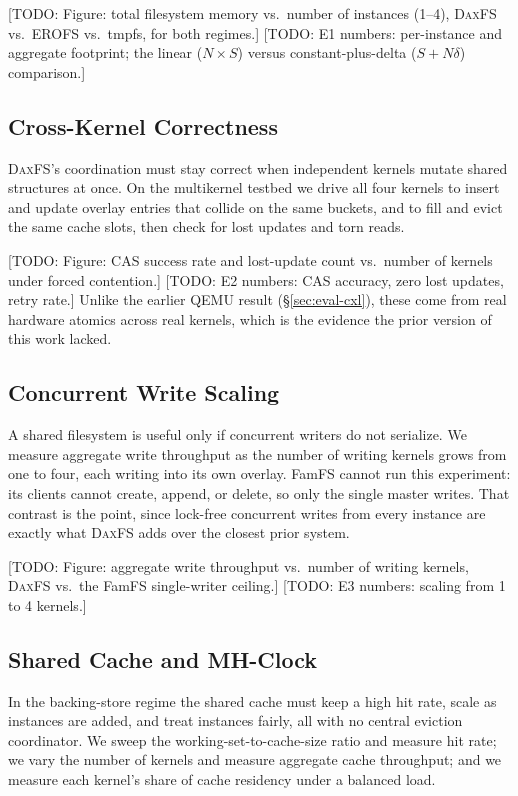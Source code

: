 \documentclass[letterpaper,twocolumn,10pt]{article}
\newcommand{\daxfs}{\textsc{DaxFS}\xspace}
\newcommand{\todo}[1]{[TODO: #1]}
\begin{document}
\todo{Figure: total filesystem memory vs.\ number of instances (1--4),
\daxfs vs.\ EROFS vs.\ tmpfs, for both regimes.}
\todo{E1 numbers: per-instance and aggregate footprint; the linear
($N\!\times\!S$) versus constant-plus-delta ($S + N\delta$) comparison.}

\subsection{Cross-Kernel Correctness}
\label{sec:eval-correct}

\daxfs's coordination must stay correct when independent kernels mutate
shared structures at once.  On the multikernel testbed we drive all
four kernels to insert and update overlay entries that collide on the
same buckets, and to fill and evict the same cache slots, then check
for lost updates and torn reads.

\todo{Figure: CAS success rate and lost-update count vs.\ number of
kernels under forced contention.}
\todo{E2 numbers: CAS accuracy, zero lost updates, retry rate.}  Unlike
the earlier QEMU result (\S\ref{sec:eval-cxl}), these come from real
hardware atomics across real kernels, which is the evidence the prior
version of this work lacked.

\subsection{Concurrent Write Scaling}
\label{sec:eval-write}

A shared filesystem is useful only if concurrent writers do not
serialize.  We measure aggregate write throughput as the number of
writing kernels grows from one to four, each writing into its own
overlay.  FamFS cannot run this experiment: its clients cannot create,
append, or delete, so only the single master writes.  That contrast is
the point, since lock-free concurrent writes from every instance are
exactly what \daxfs adds over the closest prior system.

\todo{Figure: aggregate write throughput vs.\ number of writing
kernels, \daxfs vs.\ the FamFS single-writer ceiling.}
\todo{E3 numbers: scaling from 1 to 4 kernels.}

\subsection{Shared Cache and MH-Clock}
\label{sec:eval-cache}

In the backing-store regime the shared cache must keep a high hit rate,
scale as instances are added, and treat instances fairly, all with no
central eviction coordinator.  We sweep the working-set-to-cache-size
ratio and measure hit rate; we vary the number of kernels and measure
aggregate cache throughput; and we measure each kernel's share of cache
residency under a balanced load.
\end{document}
